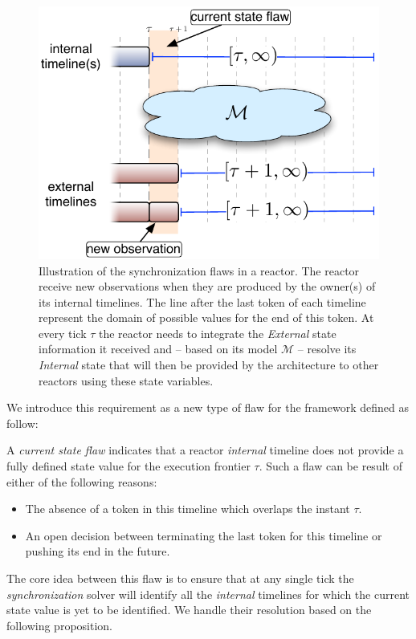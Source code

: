 \begin{figure}[!htbp]
  \centering
  \includegraphics[width=0.5\columnwidth]{figs/synch-relation}
  \caption{\small Illustration of the synchronization flaws in a reactor. The
    reactor receive new observations when they are produced by the
    owner(s) of its internal timelines. The line after the last token
    of each timeline represent the domain of possible values for the
    end of this token. At every tick $\tau$ the reactor needs to
    integrate the {\em External} state information it received and --
    based on its model $\mathcal{M}$ -- resolve its {\em Internal}
    state that will then be provided by the architecture to other
    reactors using these state variables.}
  \label{fig:synch:flaw}
\end{figure}

We introduce this requirement as a new type of flaw for the \eu
framework defined as follow:

\begin{definition}
  \label{def:csf}
  A {\em current state flaw} indicates that a reactor {\em internal}
  timeline does not provide a fully defined state value for the
  execution frontier $\tau$. Such a flaw can be result of either of
  the following reasons:

  \begin{itemize}
  \item The absence of a token in this timeline which overlaps the
    instant $\tau$.
  \item An open decision between terminating the last token for this
    timeline or pushing its end in the future.
  \end{itemize}

\end{definition}

The core idea between this flaw is to ensure that at any single tick
the {\em synchronization} solver will identify all the {\em internal}
timelines for which the current state value is yet to be
identified. We handle their resolution based on the following
proposition.

